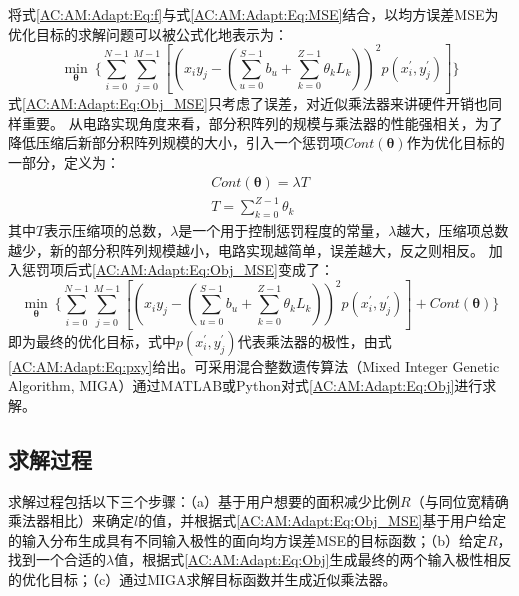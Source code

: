 将式\eqref{AC:AM:Adapt:Eq:f}与式\eqref{AC:AM:Adapt:Eq:MSE}结合，以均方误差MSE为优化目标的求解问题可以被公式化地表示为：
\begin{equation}
    \label{AC:AM:Adapt:Eq:Obj_MSE}
      \mathop{min}\limits_{\boldsymbol{\theta}}\ \{ \sum_{i=0}^{N-1} \sum_{j=0}^{M-1} [(x_iy_j - (\sum\limits_{u=0}^{S-1} b_u + \sum\limits_{k=0}^{Z-1} \theta_k L_k) )^2  p(x^{\prime}_i, y^{\prime}_j) ] \}
\end{equation}
式\eqref{AC:AM:Adapt:Eq:Obj_MSE}只考虑了误差，对近似乘法器来讲硬件开销也同样重要。
从电路实现角度来看，部分积阵列的规模与乘法器的性能强相关，为了降低压缩后新部分积阵列规模的大小，引入一个惩罚项$Cont(\boldsymbol{\theta})$作为优化目标的一部分，定义为：
\begin{align}
    Cont(\boldsymbol{\theta}) = \lambda T \label{AC:AM:Adapt:Eq:Cont} \\
    T = \sum_{k=0}^{Z-1} \theta_k \label{AC:AM:Adapt:Eq:T_exact}
\end{align}
其中$T$表示压缩项的总数，$\lambda$是一个用于控制惩罚程度的常量，$\lambda$越大，压缩项总数越少，新的部分积阵列规模越小，电路实现越简单，误差越大，反之则相反。
加入惩罚项后式\eqref{AC:AM:Adapt:Eq:Obj_MSE}变成了：
\begin{equation}
    \label{AC:AM:Adapt:Eq:Obj}
      \mathop{min}\limits_{\boldsymbol{\theta}}\ \{ \sum_{i=0}^{N-1} \sum_{j=0}^{M-1} [(x_iy_j - (\sum\limits_{u=0}^{S-1} b_u + \sum\limits_{k=0}^{Z-1} \theta_k L_k) )^2  p(x^{\prime}_i, y^{\prime}_j) ] +  Cont(\boldsymbol{\theta}) \}
\end{equation}
即为最终的优化目标，式中$p(x^{\prime}_i, y^{\prime}_j)$代表乘法器的极性，由式\eqref{AC:AM:Adapt:Eq:pxy}给出。可采用混合整数遗传算法（Mixed
Integer Genetic Algorithm, MIGA）通过MATLAB或Python对式\eqref{AC:AM:Adapt:Eq:Obj}进行求解。

\subsection{求解过程}

求解过程包括以下三个步骤：（a）基于用户想要的面积减少比例$R$（与同位宽精确乘法器相比）来确定$l$的值，并根据式\eqref{AC:AM:Adapt:Eq:Obj_MSE}基于用户给定的输入分布生成具有不同输入极性的面向均方误差MSE的目标函数；（b）给定$R$，找到一个合适的$\lambda$值，根据式\eqref{AC:AM:Adapt:Eq:Obj}生成最终的两个输入极性相反的优化目标；（c）通过MIGA求解目标函数并生成近似乘法器。

